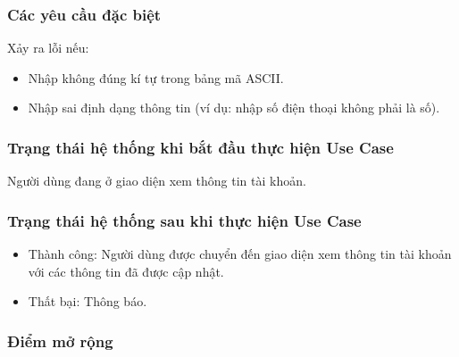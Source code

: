\subsubsection{Các yêu cầu đặc biệt}
    \item Xảy ra lỗi nếu:
    \begin{itemize}
        \item Nhập không đúng kí tự trong bảng mã ASCII.
        \item Nhập sai định dạng thông tin (ví dụ: nhập số điện thoại không phải là số).
\end{itemize}

\subsubsection{Trạng thái hệ thống khi bắt đầu thực hiện Use Case}
Người dùng đang ở giao diện xem thông tin tài khoản.

\subsubsection{Trạng thái hệ thống sau khi thực hiện Use Case}
\begin{itemize}
    \item Thành công: Người dùng được chuyển đến giao diện xem thông tin tài khoản với các thông tin đã được cập nhật.
    \item Thất bại: Thông báo.
\end{itemize}

\subsubsection{Điểm mở rộng}